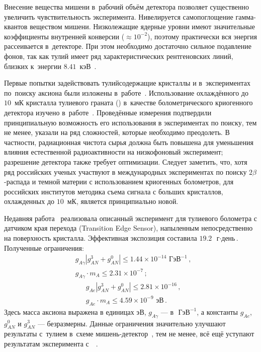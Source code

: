 \documentclass[a4paper,article,14pt]{extarticle}
\begin{document}
Внесение вещества мишени в~рабочий объём детектора позволяет существенно увеличить чувствительность эксперимента.
Нивелируется самопоглощение гамма-квантов веществом мишени.
Низколежащие ядерные уровни имеют значительные коэффициенты внутренней конверсии ($\approx 10^{-2}$), поэтому практически вся энергия рассеивается в~детекторе.
При этом необходимо достаточно сильное подавление фонов, так как тулий имеет ряд характеристических рентгеновских линий, близких к~энергии $8.41$~кэВ~\cite{Derbin2009}.

Первые попытки задействовать тулийсодержащие кристаллы {\NaTmWO} и {\NaTmMoO} в~экспериментах по~поиску аксиона были изложены в~работе~\cite{tm_first}.
Использование охлаждённого до $10$~мК кристалла тулиевого граната ({\TmAlO}) в~качестве болометрического криогенного детектора изучено в~работе~\cite{test_bolometric_tm}.
Проведённые измерения подтвердили принципиальную возможность его использования в экспериментах по поиску, тем не менее, указали на ряд сложностей, которые необходимо преодолеть.
В частности, радиационная чистота сырья должна быть повышена для уменьшения влияния естественной радиоактивности на низкофоновый эксперимент; разрешение детектора также требует оптимизации.
Следует заметить, что, хотя ряд российских ученых участвуют в международных экспериментах по поиску $2\beta$-распада и темной материи с использованием криогенных болометров, для российских институтов методика съема сигнала с больших кристаллов, охлажденных до $10$~мК, является принципиально новой.

Недавняя работа~\cite{newlimits_tm} реализовала описанный эксперимент для тулиевого болометра с датчиком края перехода (Transition Edge Sensor), напыленным непосредственно на поверхность кристалла.
Эффективная экспозиция составила $19.2$~$\text{г} \cdot \text{день}$. Полученные ограничения:
\begin{align}
     & g_{A\gamma} \left| g_{AN}^3 + g_{AN}^0 \right| \leqslant
    1.44 \times 10^{-14} \text{\ ГэВ}^{-1}\, ,                  \\
     & g_{A\gamma } \cdot m_A \leqslant
    2.31 \times 10^{-7}\, ;\nonumber
\end{align}
\begin{align}
     & g_{Ae} \left| g_{AN}^3 + g_{AN}^0 \right| \leqslant
    2.81 \times 10^{-16}\, ,                               \\
     & g_{Ae} \cdot {m_A} \leqslant
    4.59 \times 10^{-9} \text{\ эВ}\, .\nonumber
\end{align}
Здесь масса аксиона выражена в единицах эВ, $g_{A\gamma }$ --- в $\text{ ГэВ}^{-1}$, а константы $g_{Ae }$, $g_{AN}^0$ и  $g_{AN}^3$ --- безразмерны.
Данные ограничения значительно улучшают результаты с~тулием в~схеме мишень-детектор~\cite{Derbin2009}, тем не менее, всё ещё уступают результатам эксперимента с~{\Kr}~\cite{Derbin_2017_Kr}.
\end{document}
